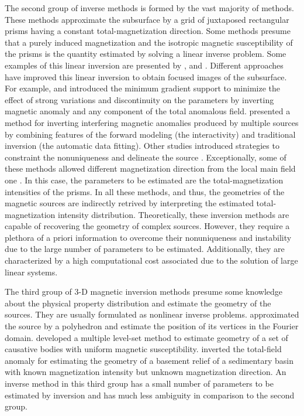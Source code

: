 The second group of inverse methods is formed by the vast majority of methods. 
These methods approximate the subsurface by a grid of juxtaposed rectangular prisms having 
a constant total-magnetization direction. Some methods presume that a purely induced 
magnetization and the isotropic magnetic susceptibility of the prisms is the quantity estimated by solving a linear inverse problem. 
Some examples of this linear inversion are presented by \cite{cribb-1976}, \cite{li_3-d_1996} and \cite{pilkington_3-d_1997}.
Different approaches have improved this linear inversion to obtain focused images of the subsurface. For example, \cite{portniaguine_focusing_1999} and \cite{portniaguine_3d_2002} introduced the minimum gradient support to minimize the effect of strong variations and discontinuity on the parameters by inverting magnetic anomaly and any component of the total anomalous field. \cite{barbosa_interactive_2006} presented a method for inverting interfering magnetic anomalies produced by multiple sources by combining  features of the forward modeling (the interactivity) and traditional inversion (the automatic data fitting). Other studies introduced strategies to constraint the nonuniqueness and delineate the source \cite[]{tontini,pilkington_3d_2009,shamsipour_3d_2011,cella_inversion_2012,abedi-2015}. Exceptionally, some of these methods allowed different magnetization direction from the local main field one \cite[e.g., ][]{pignatelli-2006}. 
In this case, the parameters to be estimated are the total-magnetization intensities 
of the prisms. 
In all these methods, and thus, the geometries of the magnetic sources are indirectly retrived by interpreting the estimated total-magnetization intensity 
distribution. 
Theoretically, these inversion methods are capable of recovering the geometry of complex 
sources. However, they require a plethora of a priori information to overcome 
their nonuniqueness and instability due to the large number of parameters 
to be estimated. Additionally, they are characterized by a high 
computational cost associated due to the solution of large linear systems.

The third group of 3-D magnetic inversion methods presume some knowledge about the 
physical property distribution and estimate the geometry of the sources. 
They are usually formulated as nonlinear inverse problems. 
\cite{wang_inversion_1990} approximated the source by a polyhedron and estimate 
the position of its vertices in the Fourier domain. 
\cite{wenbin-2017} developed a multiple level-set method to estimate geometry 
of a set of causative bodies with uniform magnetic susceptibility. 
\cite{hidalgo-2019} inverted the total-field anomaly for estimating the geometry of a basement relief of a sedimentary basin with known magnetization intensity but unknown magnetization direction. 
An inverse method in this third group has a small number of parameters to be estimated by inversion and has much less ambiguity in comparison to the second group. 

